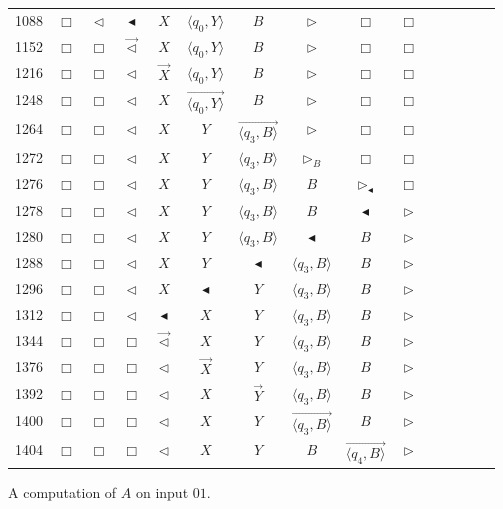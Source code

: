 \documentclass[pre,amssymb,showpacs,showkeys,preprint]{revtex4}
\begin{document}
\begin{figure}
\begin{center}
{\begin{tabular}{r|cccccccccccccc}
1088 & $\Box$ & $\lhd$ & $\blacktriangleleft$ & $X$ & $\langle q_0,Y \rangle$ & $B$ & $\rhd$ & $\Box$ & $\Box$ \\
1152 & $\Box$ & $\Box$ & $\overrightarrow{\lhd}$ & $X$ & $\langle q_0,Y \rangle$ & $B$ & $\rhd$ & $\Box$ & $\Box$ \\
1216 & $\Box$ & $\Box$ & $\lhd$ & $\overrightarrow{X}$ & $\langle q_0,Y \rangle$ & $B$ & $\rhd$ & $\Box$ & $\Box$ \\
1248 & $\Box$ & $\Box$ & $\lhd$ & $X$ & $\overrightarrow{\langle q_0,Y \rangle}$ & $B$ & $\rhd$ & $\Box$ & $\Box$ \\
1264 & $\Box$ & $\Box$ & $\lhd$ & $X$ & $Y$ & $\overrightarrow{\langle q_3,B \rangle}$ & $\rhd$ & $\Box$ & $\Box$ \\
1272 & $\Box$ & $\Box$ & $\lhd$ & $X$ & $Y$ & $\langle q_3,B \rangle$ & $\rhd_B$ & $\Box$ & $\Box$ \\
1276 & $\Box$ & $\Box$ & $\lhd$ & $X$ & $Y$ & $\langle q_3,B \rangle$ & $B$ & $\rhd_\blacktriangleleft$ & $\Box$ \\
1278 & $\Box$ & $\Box$ & $\lhd$ & $X$ & $Y$ & $\langle q_3,B \rangle$ & $B$ & $\blacktriangleleft$ & $\rhd$ \\
1280 & $\Box$ & $\Box$ & $\lhd$ & $X$ & $Y$ & $\langle q_3,B \rangle$ & $\blacktriangleleft$ & $B$ & $\rhd$ \\
1288 & $\Box$ & $\Box$ & $\lhd$ & $X$ & $Y$ & $\blacktriangleleft$ & $\langle q_3,B \rangle$ & $B$ & $\rhd$ \\
1296 & $\Box$ & $\Box$ & $\lhd$ & $X$ & $\blacktriangleleft$ & $Y$ & $\langle q_3,B \rangle$ & $B$ & $\rhd$ \\
1312 & $\Box$ & $\Box$ & $\lhd$ & $\blacktriangleleft$ & $X$ & $Y$ & $\langle q_3,B \rangle$ & $B$ & $\rhd$ \\
1344 & $\Box$ & $\Box$ & $\Box$ & $\overrightarrow{\lhd}$ & $X$ & $Y$ & $\langle q_3,B \rangle$ & $B$ & $\rhd$ \\
1376 & $\Box$ & $\Box$ & $\Box$ & $\lhd$ & $\overrightarrow{X}$ & $Y$ & $\langle q_3,B \rangle$ & $B$ & $\rhd$ \\
1392 & $\Box$ & $\Box$ & $\Box$ & $\lhd$ & $X$ & $\overrightarrow{Y}$ & $\langle q_3,B \rangle$ & $B$ & $\rhd$ \\
1400 & $\Box$ & $\Box$ & $\Box$ & $\lhd$ & $X$ & $Y$ & $\overrightarrow{\langle q_3,B \rangle}$ & $B$ & $\rhd$ \\
1404 & $\Box$ & $\Box$ & $\Box$ & $\lhd$ & $X$ & $Y$ & $B$ & $\overrightarrow{\langle q_4,B \rangle}$ & $\rhd$ \\
\end{tabular}
}
\end{center}
\caption{\label{fig:example-hyper-sca-2}A computation of $A$ on input $01$.}
\end{figure}
\end{document}
